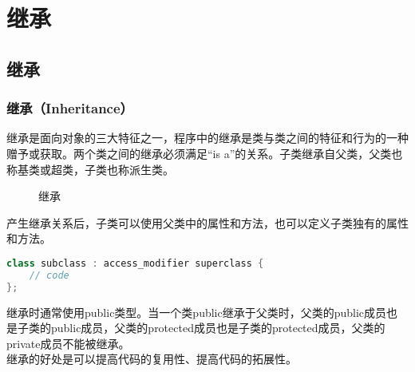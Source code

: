 \chapter{继承}

\section{继承}

\subsection{继承（Inheritance）}

继承是面向对象的三大特征之一，程序中的继承是类与类之间的特征和行为的一种赠予或获取。两个类之间的继承必须满足“is a”的关系。子类继承自父类，父类也称基类或超类，子类也称派生类。

\begin{figure}[H]
	\centering
	\caption{继承}
\end{figure}

产生继承关系后，子类可以使用父类中的属性和方法，也可以定义子类独有的属性和方法。

\vspace{-0.5cm}

\begin{lstlisting}[language=C++]
class subclass : access_modifier superclass {
    // code
};
\end{lstlisting}

继承时通常使用public类型。当一个类public继承于父类时，父类的public成员也是子类的public成员，父类的protected成员也是子类的protected成员，父类的private成员不能被继承。\\

继承的好处是可以提高代码的复用性、提高代码的拓展性。\\

